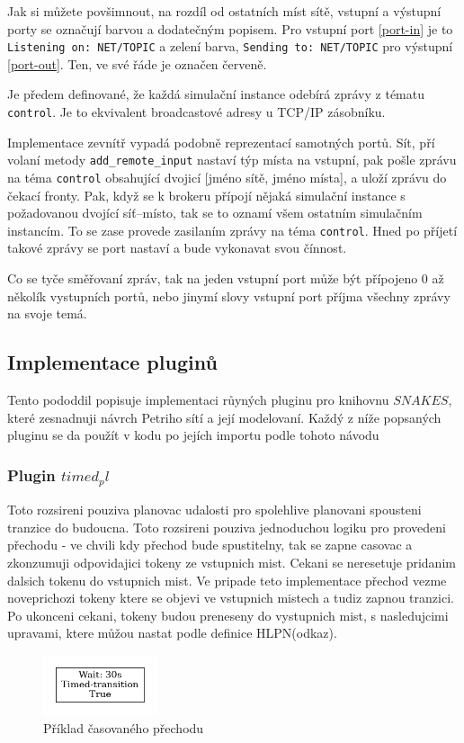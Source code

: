 Jak si můžete povšimnout, na rozdíl od ostatních míst sítě, vstupní a výstupní porty se označují barvou a dodatečným popisem. Pro vstupní port \ref{port-in} je to \texttt{Listening on: NET/TOPIC} a zelení barva, \texttt{Sending to: NET/TOPIC} pro výstupní \ref{port-out}. Ten, ve své řáde je označen červeně.

Je předem definované, že každá simulační instance odebírá zprávy z tématu \texttt{control}. Je to ekvivalent broadcastové adresy u TCP/IP zásobníku.

Implementace zevnítř vypadá podobně reprezentací samotných portů. Sít, pří volaní metody \texttt{add\_remote\_input} nastaví týp místa na vstupní, pak pošle zprávu na téma \texttt{control} obsahující dvojicí [jméno sítě, jméno místa], a uloží zprávu do čekací fronty. Pak, když se k brokeru přípojí nějaká simulační instance s požadovanou dvojící síť--místo, tak se to oznamí všem ostatním simulačním instancím. To se zase provede zasilaním zprávy na téma \texttt{control}. Hned po příjetí takové zprávy se port nastaví a bude vykonavat svou čínnost.

Co se tyče směřovaní zpráv, tak na jeden vstupní port může být přípojeno 0 až několík vystupních portů, nebo jinymí slovy vstupní port příjma všechny zprávy na svoje temá.

\subsection{Implementace pluginů}
\label{sec:plug-impl}
Tento pododdil popisuje implementaci růyných pluginu pro knihovnu $SNAKES$, které zesnadnuji návrch Petriho sítí a její modelovaní. Každý z níže popsaných pluginu se da  použít v kodu po jejích importu podle tohoto návodu 

\subsubsection{Plugin $timed_pl$}
\label{subsec:timed_pl}
Toto rozsireni pouziva planovac udalosti pro spolehlive planovani spousteni tranzice do budoucna. Toto rozsireni pouziva jednoduchou logiku pro provedeni přechodu - ve chvili kdy přechod bude spustitelny, tak se zapne casovac a zkonzumuji odpovidajici tokeny ze vstupnich mist. Cekani se neresetuje pridanim dalsich tokenu do vstupnich mist. Ve pripade teto implementace přechod vezme noveprichozi tokeny ktere se objevi ve vstupnich mistech a tudiz zapnou tranzici. Po ukonceni cekani, tokeny budou preneseny do vystupnich mist, s nasledujcimi upravami, ktere můžou nastat podle definice HLPN(odkaz).
\begin{figure}[hbt]
  \centering
  \includegraphics[width=0.3\textwidth]{obrazky-figures/timed-transition.png}
  \caption{Příklad časovaného přechodu}
  \label{timed-transition}
\end{figure}

